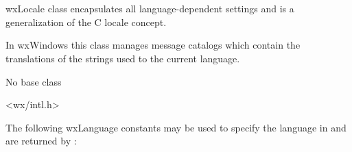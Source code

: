 \section{}\label{wxlocale}

wxLocale class encapsulates all language-dependent settings and is a
generalization of the C locale concept.

In wxWindows this class manages message catalogs which contain the translations
of the strings used to the current language.



No base class




<wx/intl.h>




\label{wxlanguage}

The following wxLanguage constants may be used to specify the language
in  and are returned by 
:




